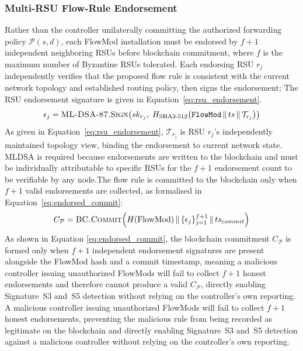 \documentclass[12pt, a4paper]{report}
\begin{document}
\subsubsection{Multi-RSU Flow-Rule Endorsement}
Rather than the controller unilaterally committing the authorized
forwarding policy $\mathcal{P}(s,d)$, each FlowMod installation
must be endorsed by $f+1$ independent neighboring RSUs before
blockchain commitment, where $f$ is the maximum number of Byzantine
RSUs tolerated. Each endorsing RSU $r_j$ independently verifies
that the proposed flow rule is consistent with the current network
topology and established routing policy, then signs the endorsement;
The \ac{RSU} endorsement signature is given in
Equation~\eqref{eq:rsu_endorsement}.
\begin{equation}
\epsilon_j = \textsc{ML-DSA-87.Sign}\!\left(
sk_{r_j},\;
H_{\text{SHA3-512}}\!\left(
\texttt{FlowMod} \,\|\, ts \,\|\,
\mathcal{T}_{r_j}
\right)\right)
\label{eq:rsu_endorsement}
\end{equation}
As given in Equation~\eqref{eq:rsu_endorsement},
$\mathcal{T}_{r_j}$ is \ac{RSU} $r_j$'s
independently maintained topology view, binding
the endorsement to current network state. \ac{MLDSA}
is required because endorsements are written to the
blockchain and must be individually attributable to
specific \ac{RSU}s for the $f{+}1$ endorsement
count to be verifiable by any node.The flow rule is committed to the blockchain
only when $f+1$ valid endorsements are collected,
as formalised in Equation~\eqref{eq:endorsed_commit}:
\begin{equation}
C_{\mathcal{P}} = \textsc{BC.Commit}\!\left(
H(\text{FlowMod}) \,\|\,
\{\epsilon_j\}_{j=1}^{f+1} \,\|\, ts_{commit}\right)
\label{eq:endorsed_commit}
\end{equation}
As shown in Equation \eqref{eq:endorsed_commit}, the
blockchain commitment $C_{\mathcal{P}}$ is formed only when $f+1$
independent endorsement signatures are present alongside the FlowMod
hash and a commit timestamp, meaning a malicious controller issuing
unauthorized FlowMods will fail to collect $f+1$ honest endorsements
and therefore cannot produce a valid $C_{\mathcal{P}}$, directly
enabling Signature~S3 and~S5 detection without relying on the
controller's own reporting.
A malicious controller issuing unauthorized FlowMods will fail to
collect $f+1$ honest endorsements, preventing the malicious rule
from being recorded as legitimate on the blockchain and directly
enabling Signature~S3 and~S5 detection against a malicious
controller without relying on the controller's own reporting.
\end{document}
